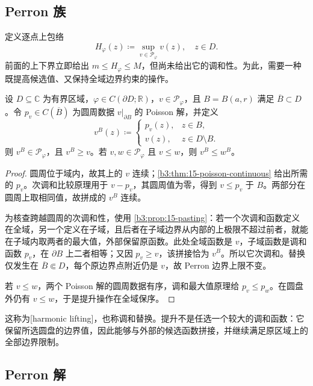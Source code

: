 \subsection{Perron 族}
\label{b3:subsec:160202}

定义逐点上包络
\[
 H_\varphi(z)\coloneqq\sup_{v\in\mathcal P_\varphi}v(z),
 \quad z\in D.
\]
前面的上下界立即给出 \(m\le H_\varphi\le M\)，但尚未给出它的调和性。为此，需要一种既提高候选值、又保持全域边界约束的操作。

\begin{lemma}[内部圆盘上的调和提升]\label{b3:lem:16-harmonic-lifting}
设 \(D\subseteq\mathbb C\) 为有界区域，\(\varphi\in C(\partial D;\mathbb R)\)，\(v\in\mathcal P_\varphi\)，且 \(B=B(a,r)\) 满足 \(\overline B\subset D\)。令 \(p_v\in C(\overline B)\) 为圆周数据 \(v|_{\partial B}\) 的 Poisson 解，并定义
\[
 v^B(z)\coloneqq
 \begin{cases}
 p_v(z),&z\in B,\\
 v(z),&z\in D\setminus B.
 \end{cases}
\]
则 \(v^B\in\mathcal P_\varphi\)，且 \(v^B\ge v\)。若 \(v,w\in\mathcal P_\varphi\) 且 \(v\le w\)，则 \(v^B\le w^B\)。
\end{lemma}
\begin{proof}
圆周位于域内，故其上的 \(v\) 连续；\cref{b3:thm:15-poisson-continuous} 给出所需的 \(p_v\)。次调和比较原理用于 \(v-p_v\)，其圆周值为零，得到 \(v\le p_v\) 于 \(B\)。两部分在圆周上取相同值，故拼成的 \(v^B\) 连续。

为核查跨越圆周的次调和性，使用 \cref{b3:prop:15-pasting}：若一个次调和函数定义在全域，另一个定义在子域，且后者在子域边界从内部的上极限不超过前者，就能在子域内取两者的最大值，外部保留原函数。此处全域函数是 \(v\)，子域函数是调和函数 \(p_v\)，在 \(\partial B\) 上二者相等；又因 \(p_v\ge v\)，该拼接恰为 \(v^B\)。所以它次调和。替换仅发生在 \(\overline B\Subset D\)，每个原边界点附近仍是 \(v\)，故 Perron 边界上限不变。

若 \(v\le w\)，两个 Poisson 解的圆周数据有序，调和最大值原理给 \(p_v\le p_w\)。在圆盘外仍有 \(v\le w\)，于是提升操作在全域保序。
\end{proof}

这称为[harmonic lifting]，也称调和替换。提升不是任选一个较大的调和函数：它保留所选圆盘的边界值，因此能够与外部的候选函数拼接，并继续满足原区域上的全部边界限制。

\subsection{Perron 解}
\label{b3:subsec:160203}

